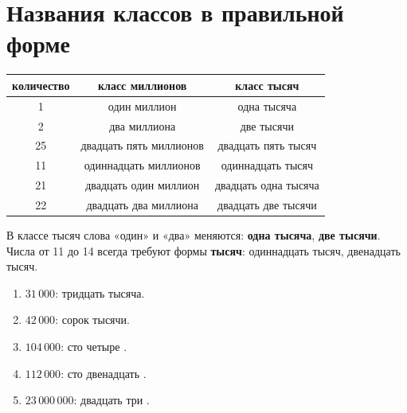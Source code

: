 \newpage
\section{Названия классов в правильной форме}

\begin{problembox}
  \begin{center}
  \renewcommand{\arraystretch}{1.4}
  \begin{tabular}{c|c|c}
    \toprule
    количество & класс миллионов & класс тысяч \\
    \midrule
    1 & один миллион & одна тысяча \\
    2 & два миллиона & две тысячи \\
    25 & двадцать пять миллионов & двадцать пять тысяч \\
    11 & одиннадцать миллионов & одиннадцать тысяч \\
    21 & двадцать один миллион & двадцать одна тысяча \\
    22 & двадцать два миллиона & двадцать две тысячи \\
    \bottomrule
  \end{tabular}
  \end{center}
\end{problembox}

\begin{notebox}[Запомните]
  В классе тысяч слова «один» и «два» меняются: \textbf{одна тысяча},
  \textbf{две тысячи}. Числа от 11 до 14 всегда требуют формы
  \textbf{тысяч}: одиннадцать тысяч, двенадцать тысяч.
\end{notebox}

\begin{practicebox}
  \begin{enumerate}[label=\textbf{\arabic*.}]
    \item \(31\,000\): тридцать \answerblank[16mm] тысяча.
    \item \(42\,000\): сорок \answerblank[16mm] тысячи.
    \item \(104\,000\): сто четыре \answerblank[20mm].
    \item \(112\,000\): сто двенадцать \answerblank[20mm].
    \item \(23\,000\,000\): двадцать три \answerblank[22mm].
  \end{enumerate}
\end{practicebox}

